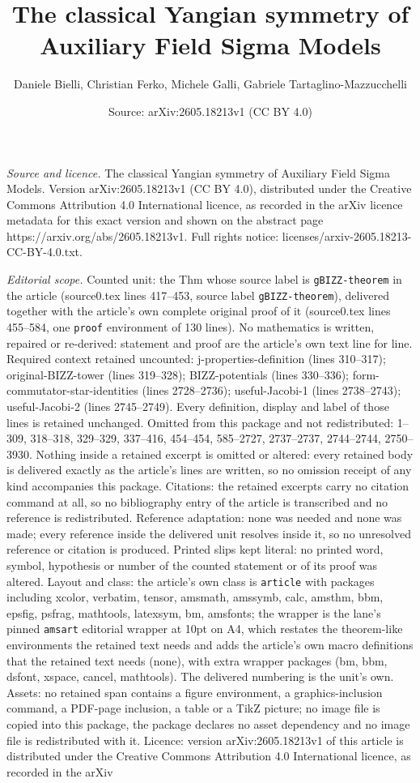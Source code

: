 \documentclass[10pt,a4paper]{amsart}
\title[The classical Yangian symmetry of Auxiliary Field Sigma Mode]{The classical Yangian symmetry of Auxiliary Field Sigma Models}
\author{Daniele Bielli, Christian Ferko, Michele Galli, Gabriele Tartaglino-Mazzucchelli}
\date{Source: arXiv:2605.18213v1 (CC BY 4.0)}
\begin{document}
\maketitle

\noindent\emph{Source and licence.} The classical Yangian symmetry of Auxiliary Field Sigma Models. Version arXiv:2605.18213v1 (CC BY 4.0), distributed under the Creative Commons Attribution 4.0 International licence, as recorded in the arXiv licence metadata for this exact version and shown on the abstract page https://arxiv.org/abs/2605.18213v1. Full rights notice: licenses/arxiv-2605.18213-CC-BY-4.0.txt.\par\smallskip

\noindent\textit{Editorial scope.} Counted unit: the Thm whose source label is \texttt{gBIZZ-theorem} in the article (source0.tex lines 417--453, source label \texttt{gBIZZ-theorem}), delivered together with the article's own complete original proof of it (source0.tex lines 455--584, one \texttt{proof} environment of 130 lines). No mathematics is written, repaired or re-derived: statement and proof are the article's own text line for line. Required context retained uncounted: j-properties-definition (lines 310--317); original-BIZZ-tower (lines 319--328); BIZZ-potentials (lines 330--336); form-commutator-star-identities (lines 2728--2736); useful-Jacobi-1 (lines 2738--2743); useful-Jacobi-2 (lines 2745--2749). Every definition, display and label of those lines is retained unchanged. Omitted from this package and not redistributed: 1--309, 318--318, 329--329, 337--416, 454--454, 585--2727, 2737--2737, 2744--2744, 2750--3930. Nothing inside a retained excerpt is omitted or altered: every retained body is delivered exactly as the article's lines are written, so no omission receipt of any kind accompanies this package. Citations: the retained excerpts carry no citation command at all, so no bibliography entry of the article is transcribed and no reference is redistributed. Reference adaptation: none was needed and none was made; every reference inside the delivered unit resolves inside it, so no unresolved reference or citation is produced. Printed slips kept literal: no printed word, symbol, hypothesis or number of the counted statement or of its proof was altered. Layout and class: the article's own class is \texttt{article} with packages including xcolor, verbatim, tensor, amsmath, amssymb, calc, amsthm, bbm, epsfig, psfrag, mathtools, latexsym, bm, amsfonts; the wrapper is the lane's pinned \texttt{amsart} editorial wrapper at 10pt on A4, which restates the theorem-like environments the retained text needs and adds the article's own macro definitions that the retained text needs (none), with extra wrapper packages (bm, bbm, dsfont, xspace, cancel, mathtools). The delivered numbering is the unit's own. Assets: no retained span contains a figure environment, a graphics-inclusion command, a PDF-page inclusion, a table or a TikZ picture; no image file is copied into this package, the package declares no asset dependency and no image file is redistributed with it. Licence: version arXiv:2605.18213v1 of this article is distributed under the Creative Commons Attribution 4.0 International licence, as recorded in the arXiv 
\end{document}
